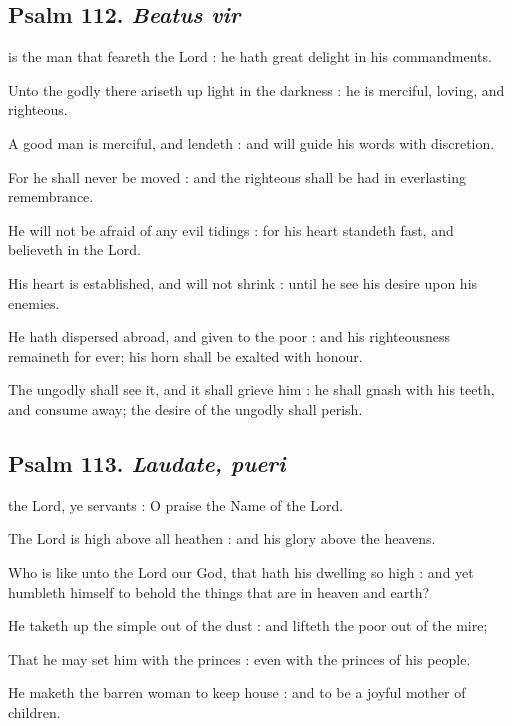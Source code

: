 \subsection{Psalm 112. \textit{Beatus vir}}

 is the man that feareth the Lord : he hath great delight in his commandments.\par
{}
Unto the godly there ariseth up light in the darkness : he is merciful, loving, and righteous.\par
{}A good man is merciful, and lendeth : and will guide his words with discretion.\par
{}For he shall never be moved : and the righteous shall be had in everlasting remembrance.\par
{}He will not be afraid of any evil tidings : for his heart standeth fast, and believeth in the Lord.\par
{}His heart is established, and will not shrink : until he see his desire upon his enemies.\par
{}He hath dispersed abroad, and given to the poor : and his righteousness remaineth for ever; his horn shall be exalted with honour.\par
{}The ungodly shall see it, and it shall grieve him : he shall gnash with his teeth, and consume away; the desire of the ungodly shall perish.\par

\subsection{Psalm 113. \textit{Laudate, pueri}}

 the Lord, ye servants : O praise the Name of the Lord.\par
{}
The Lord is high above all heathen : and his glory above the heavens.\par
{}Who is like unto the Lord our God, that hath his dwelling so high : and yet humbleth himself to behold the things that are in heaven and earth?\par
{}He taketh up the simple out of the dust : and lifteth the poor out of the mire;\par
{}That he may set him with the princes : even with the princes of his people.\par
{}He maketh the barren woman to keep house : and to be a joyful mother of children.\par

